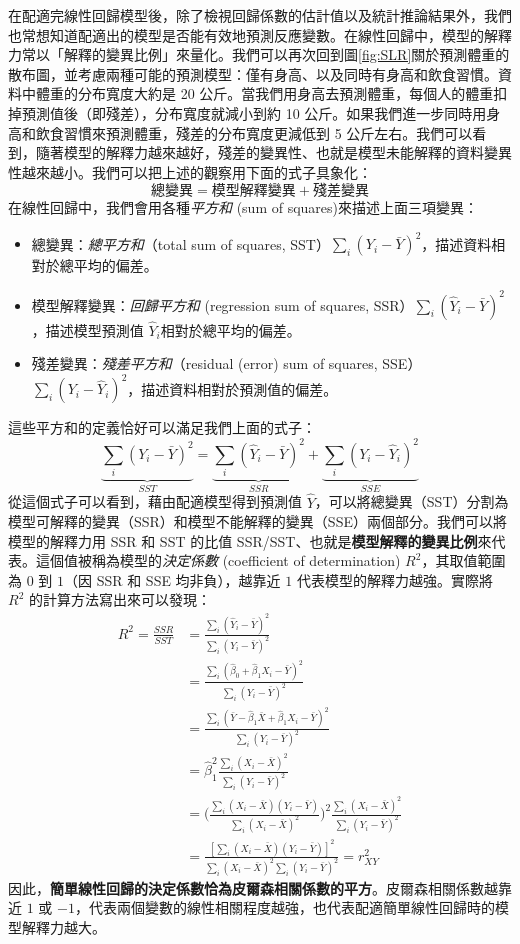     在配適完線性回歸模型後，除了檢視回歸係數的估計值以及統計推論結果外，我們也常想知道配適出的模型是否能有效地預測反應變數。在線性回歸中，模型的解釋力常以「解釋的變異比例」來量化。我們可以再次回到圖\ref{fig:SLR}關於預測體重的散布圖，並考慮兩種可能的預測模型：僅有身高、以及同時有身高和飲食習慣。資料中體重的分布寬度大約是 20 公斤。當我們用身高去預測體重，每個人的體重扣掉預測值後（即殘差），分布寬度就減小到約 10 公斤。如果我們進一步同時用身高和飲食習慣來預測體重，殘差的分布寬度更減低到 5 公斤左右。我們可以看到，隨著模型的解釋力越來越好，殘差的變異性、也就是模型未能解釋的資料變異性越來越小。我們可以把上述的觀察用下面的式子具象化：
    \[\text{總變異}  = \text{模型解釋變異} + \text{殘差變異}\]
    在線性回歸中，我們會用各種\textit{平方和} (sum of squares)來描述上面三項變異：
    \begin{itemize}
        \item 總變異：\textit{總平方和}（total sum of squares, SST）$\sum_i (Y_i - \bar{Y})^2$，描述資料相對於總平均的偏差。
        \item 模型解釋變異：\textit{回歸平方和} (regression sum of squares, SSR）$\sum_i (\hat{Y}_i - \bar{Y})^2$，描述模型預測值 $\hat{Y}_i$相對於總平均的偏差。
        \item 殘差變異：\textit{殘差平方和}（residual (error) sum of squares, SSE）$\sum_i (Y_i - \hat{Y}_i)^2$，描述資料相對於預測值的偏差。
    \end{itemize}
    這些平方和的定義恰好可以滿足我們上面的式子：
    \[\underbrace{\sum_i (Y_i - \bar{Y})^2}_{SST} = \underbrace{\sum_i (\hat{Y}_i - \bar{Y})^2}_{SSR} + \underbrace{\sum_i (Y_i - \hat{Y}_i)^2}_{SSE}\]
    從這個式子可以看到，藉由配適模型得到預測值 $\hat{Y}$，可以將總變異（SST）分割為模型可解釋的變異（SSR）和模型不能解釋的變異（SSE）兩個部分。我們可以將模型的解釋力用 SSR 和 SST 的比值 SSR/SST、也就是\textbf{模型解釋的變異比例}來代表。這個值被稱為模型的\textit{決定係數} (coefficient of determination) $R^2$，其取值範圍為 $0$ 到 $1$（因 SSR 和 SSE 均非負），越靠近 $1$ 代表模型的解釋力越強。實際將 $R^2$ 的計算方法寫出來可以發現：
    \begin{align*}
        R^2 = \frac{SSR}{SST} &= \frac{\sum_i (\hat{Y}_i-\bar{Y})^2}{\sum_i (Y_i - \bar{Y})^2}\\
        &= \frac{\sum_i (\hat{\beta}_0 + \hat{\beta}_1 X_i -\bar{Y})^2}{\sum_i (Y_i - \bar{Y})^2}\\
        &= \frac{\sum_i (\bar{Y} - \hat{\beta}_1 \bar{X}+ \hat{\beta}_1 X_i -\bar{Y})^2}{\sum_i (Y_i - \bar{Y})^2}\\
        &= \hat{\beta}_1^2 \frac{\sum_i (X_i - \bar{X})^2}{\sum_i (Y_i - \bar{Y})^2}\\
        &= \Big(\frac{\sum_i (X_i-\bar{X})(Y_i-\bar{Y})}{\sum_i (X_i-\bar{X})^2}\Big)^2 \frac{\sum_i (X_i - \bar{X})^2}{\sum_i (Y_i - \bar{Y})^2} \\
        &= \frac{[\sum_i (X_i-\bar{X})(Y_i-\bar{Y})]^2}{\sum_i (X_i - \bar{X})^2\sum_i (Y_i - \bar{Y})^2} = r_{XY}^2
    \end{align*}
    因此，\textbf{簡單線性回歸的決定係數恰為皮爾森相關係數的平方}。皮爾森相關係數越靠近 $1$ 或 $-1$，代表兩個變數的線性相關程度越強，也代表配適簡單線性回歸時的模型解釋力越大。

